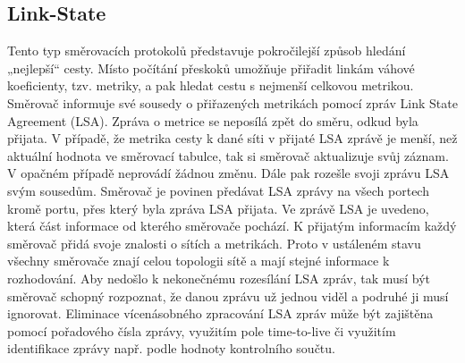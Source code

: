 \subsection{Link-State}
Tento typ směrovacích protokolů představuje pokročilejší způsob hledání „nejlepší“
cesty. Místo počítání přeskoků umožňuje přiřadit linkám váhové koeficienty, tzv. metriky, a
pak hledat cestu s nejmenší celkovou metrikou. Směrovač informuje své sousedy o
přiřazených metrikách pomocí zpráv Link State Agreement (LSA). Zpráva o metrice se
neposílá zpět do směru, odkud byla přijata. V případě, že metrika cesty k dané síti v přijaté
LSA zprávě je menší, než aktuální hodnota ve směrovací tabulce, tak si směrovač aktualizuje
svůj záznam. V opačném případě neprovádí žádnou změnu. Dále pak rozešle svoji zprávu
LSA svým sousedům. Směrovač je povinen předávat LSA zprávy na všech portech kromě
portu, přes který byla zpráva LSA přijata. Ve zprávě LSA je uvedeno, která část informace od
kterého směrovače pochází. K přijatým informacím každý směrovač přidá svoje znalosti o
sítích a metrikách. Proto v ustáleném stavu všechny směrovače znají celou topologii sítě a
mají stejné informace k rozhodování. Aby nedošlo k nekonečnému rozesílání LSA zpráv, tak musí být směrovač schopný
rozpoznat, že danou zprávu už jednou viděl a podruhé ji musí ignorovat. Eliminace
vícenásobného zpracování LSA zpráv může být zajištěna pomocí pořadového čísla zprávy,
využitím pole time-to-live či využitím identifikace zprávy např. podle hodnoty kontrolního
součtu.

